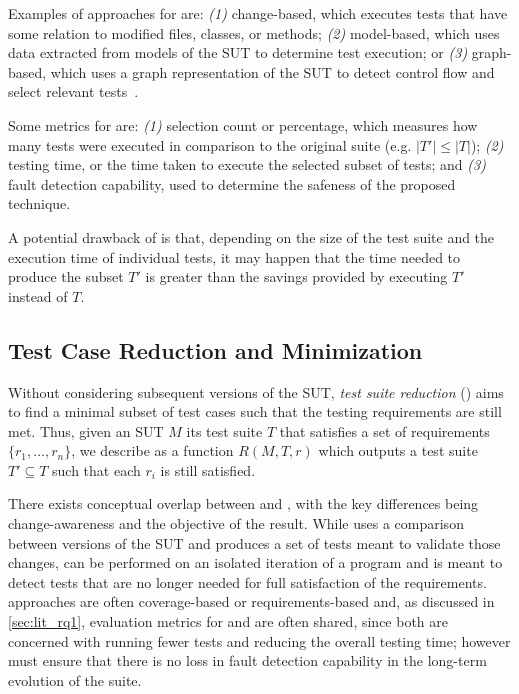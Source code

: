Examples of approaches for \tcs are: \textit{(1)} change-based, which executes tests that have some relation to modified files, classes, or methods; \textit{(2)} model-based, which uses data extracted from models of the SUT to determine test execution; or \textit{(3)} graph-based, which uses a graph representation of the SUT to detect control flow and select relevant tests~\cite{kazmi_effective_2017}.

Some metrics for \tcs are: \textit{(1)} selection count or percentage, which measures how many tests were executed in comparison to the original suite (e.g. $|T'| \leq |T|$); \textit{(2)} testing time, or the time taken to execute the selected subset of tests; and \textit{(3)} fault detection capability, used to determine the safeness of the proposed technique.

A potential drawback of \tcs is that, depending on the size of the test suite and the execution time of individual tests, it may happen that the time needed to produce the subset $T'$ is greater than the savings provided by executing $T'$ instead of $T$. 

\subsection{Test Case Reduction and Minimization}
\label{sec:tsr}

Without considering subsequent versions of the SUT, \textit{test suite reduction} (\tsr) aims to find a minimal subset of test cases such that the testing requirements are still met.
Thus, given an SUT $M$ its test suite $T$ that satisfies a set of requirements $\{r_1, ..., r_n\}$, we describe \tsr as a function $R(M, T, r)$ which outputs a test suite $T' \subseteq T$ such that each $r_i$ is still satisfied.

There exists conceptual overlap between \tcs and \tsr, with the key differences being change-awareness and the objective of the result.
While \tcs uses a comparison between versions of the SUT and produces a set of tests meant to validate those changes, \tsr can be performed on an isolated iteration of a program and is meant to detect tests that are no longer needed for full satisfaction of the requirements.
\tsr approaches are often coverage-based or requirements-based and, as discussed in \autoref{sec:lit_rq1}, evaluation metrics for \tcp and \tsr are often shared, since both are concerned with running fewer tests and reducing the overall testing time; however \tsr must ensure that there is no loss in fault detection capability in the long-term evolution of the suite.

